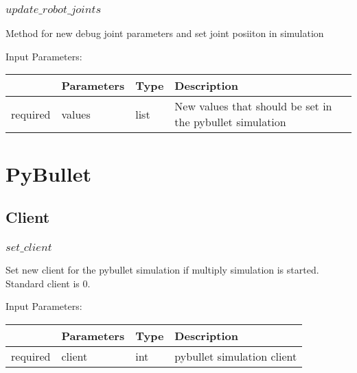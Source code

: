 \documentclass[
	ngerman,
	accentcolor=9c,%
	type=intern,
	marginpar=false
	]{tudapub}
\begin{document}
\vspace{0.5cm}


\subsubsection{$update\_robot\_joints$}
\noindent Method for new debug joint parameters and set joint posiiton in simulation

\vspace{0.5cm}
\noindent Input Parameters:
\vspace{0.5cm}

\begin{tabular}{|p{}|p{}|p{}| p{}|}
\hline
 & \textbf{Parameters} & \textbf{Type} & \textbf{Description} \\
\hline
required & values & list & New values that should be set in the pybullet simulation\\
\hline
\end{tabular}
\vspace{1cm}




\newpage
\section{PyBullet}

\subsection{Client}
\subsubsection{$set\_client$}
\noindent Set new client for the pybullet simulation if multiply simulation is started. Standard client is 0.


\vspace{0.5cm}
\noindent Input Parameters:
\vspace{0.5cm}

\begin{tabular}{|p{}|p{}|p{}| p{}|}
\hline
 & \textbf{Parameters} & \textbf{Type} & \textbf{Description} \\
\hline
required & client & int & pybullet simulation client\\
\hline
\end{tabular}
\vspace{0.5cm}
\end{document}
